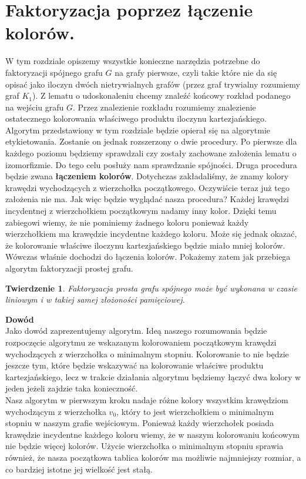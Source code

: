 \documentclass[12pt,a4paper,titlepage]{article}
\newtheorem{twr}{Twierdzenie}
\newcommand\tab[1][1cm]{\hspace*{#1}}
\begin{document}
\section{Faktoryzacja poprzez łączenie kolorów.}
W tym rozdziale opiszemy wszystkie konieczne narzędzia potrzebne do faktoryzacji spójnego grafu $G$ na grafy pierwsze, czyli takie które nie da się opisać jako iloczyn dwóch nietrywialnych grafów (przez graf trywialny rozumiemy graf $K_1$). Z lematu o udoskonaleniu chcemy znaleźć końcowy rozkład podanego na wejściu grafu $G$. Przez znalezienie rozkładu rozumiemy znalezienie ostatecznego kolorowania właściwego produktu iloczynu kartezjańskiego. \\
\tab[0.6cm]Algorytm przedstawiony w tym rozdziale będzie opierał się na algorytmie etykietowania. Zostanie on jednak rozszerzony o dwie procedury. Po pierwsze dla każdego poziomu będziemy sprawdzali czy zostały zachowane założenia lematu o izomorfizmie. Do tego celu posłuży nam sprawdzanie spójności. Druga procedura będzie zwana \textbf{łączeniem kolorów}. Dotychczas zakładaliśmy, że znamy kolory krawędzi wychodzących z wierzchołka początkowego. Oczywiście teraz już tego założenia nie ma. Jak więc będzie wyglądać nasza procedura? Każdej krawędzi incydentnej z wierzchołkiem początkowym nadamy inny kolor. Dzięki temu zabiegowi wiemy, że nie pominiemy żadnego koloru ponieważ każdy wierzchołkiem ma krawędzie incydentne każdego koloru. Może się jednak okazać, że kolorowanie właściwe iloczynu kartezjańskiego będzie miało mniej kolorów. Wówczas właśnie dochodzi do łączenia kolorów. Pokażemy zatem jak przebiega algorytm faktoryzacji prostej grafu. 
\\
\begin{twr}Faktoryzacja prosta grafu spójnego może być wykonana w czasie liniowym i w takiej samej złożoności pamięciowej.
\end{twr}
\tab[-0.6cm]\textbf{Dowód}\\
\tab[0.6cm]Jako dowód zaprezentujemy algorytm. Ideą naszego rozumowania będzie rozpoczęcie algorytmu ze wskazanym kolorowaniem początkowym krawędzi wychodzących z wierzchołka o minimalnym stopniu. Kolorowanie to nie będzie jeszcze tym, które będzie wskazywać na kolorowanie właściwe produktu kartezjańskiego, lecz w trakcie działania algorytmu będziemy łączyć dwa kolory w jeden jeżeli zajdzie taka konieczność. \\
\tab[0.6cm]Nasz algorytm w pierwszym kroku nadaje różne kolory wszystkim krawędziom wychodzącym z wierzchołka $v_0$, który to jest wierzchołkiem o minimalnym stopniu w naszym grafie wejściowym. Ponieważ każdy wierzchołek posiada krawędzie incydentne każdego koloru wiemy, że w naszym kolorowaniu końcowym nie będzie więcej kolorów. Użycie wierzchołka o minimalnym stopniu sprawia również, że nasza początkowa tablica kolorów ma możliwie najmniejszy rozmiar, a co bardziej istotne jej wielkość jest stałą. \\
\end{document}
